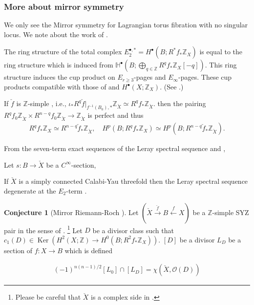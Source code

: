 \documentclass[a4paper,dvipdfmx,reqno,12pt]{amsart}
\theoremstyle{definition}
\newtheorem{Conj}[Thm]{Conjecture}
\newcommand{\Z}{\mathbb{Z}}%
\newcommand{\mb}[1]{\mathbb{#1}}%
\newcommand{\mcal}[1]{\mathcal{#1}}%
\newcommand{\opn}[1]{\operatorname{#1}}
\newcommand{\xto}[1]{\xrightarrow{#1}}
\newcommand{\xgets}[1]{\xleftarrow{#1}}
\numberwithin{equation}{section}
\begin{document}
\subsubsection{More about mirror symmetry}

We only see the Mirror symmetry for Lagrangian torus fibration
with no singular locus.
We note about the work of 
\cite{grossSpecialLagrangianFibrations1998a,grossSpecialLagrangianFibrations1999}.



The ring structure of the total complex $E_2^{\bullet,*}=H^{\bullet}(B;R^{*}f_*\Z_X)$
is equal to the ring structure which is induced from 
$\mb{H}^{\bullet}(B;\bigoplus_{q\in \Z}R^{q}f_*\Z_X[-q])$. This ring structure induces
the cup product on $E_{r\geq 3}$-pages and $E_{\infty}$-pages.
These cup products compatible with those of 
 and $H^{\bullet}(X;\Z_X)$. (See \cite[IV 6.8., Appendix A]{bredonSheafTheory1997a}.)

If $\check{f}$ is $\Z$-simple \cite[Definition 2.1]{grossSpecialLagrangianFibrations1998a} 
, i.e., $\iota_*R^{q}\check{f}|_{f^{-1}(B_0),*}\Z_{\check{X}}\simeq R^{q}f_*\Z_{\check{X}}$.
then the pairing $R^{q}f_0\Z_{\check{X}} \times R^{n-q}f_0\Z_{\check{X}}\to \Z_{\check{X}}$
is perfect and thus
\begin{align}
R^{q}f_*\Z_X\simeq R^{n-q}\check{f}_*\Z_{\check{X}},
\quad H^{p}(B;R^{q}f_*\Z_X)\simeq H^{p}(B;R^{n-q}\check{f}_*\Z_{\check{X}}).
\end{align}

From the seven-term exact sequences of the Leray spectral sequence and \cite[Remark ]{}, 

Let $s:B\to \check{X}$ be a $C^{\infty}$-section, 

If $\check{X}$ is a simply connected Calabi-Yau threefold then the Leray 
spectral sequence degenerate at the $E_2$-term \cite[Theorem 3.9]{}.

\begin{Conj}[{Mirror Riemann-Roch \cite[Conjecture 4.9]{grossSpecialLagrangianFibrations1998a}}]
Let $(\check{X} \xto{\check{f}} B \xgets{f} X)$ be a $\Z$-simple SYZ pair in the sense of 
\cite[Definition 2.1, 2.3]{grossSpecialLagrangianFibrations1998a}.
\footnote{Please be careful that $\check{X}$ is a complex side in 
\cite{grossSpecialLagrangianFibrations1998a}.}
Let $D$ be a divisor class such that
$c_1(D)\in\opn{Ker}(H^{2}(X;\Z)\to H^{0}(B;R^{2}f_*\Z_{X}))$.
$[D]$ be a divisor
$L_{D}$ be a section of $f:X\to B$ which is defined

\begin{align}
    (-1)^{n(n-1)/2}[L_0] \cap [L_D]=\chi(\check{X},\mcal{O}(D))
  \end{align}
\end{Conj}
\end{document}
